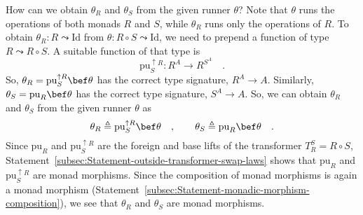 How can we obtain $\theta_{R}$ and $\theta_{S}$ from the given runner
$\theta$? Note that $\theta$ runs the operations of both monads
$R$ and $S$, while $\theta_{R}$ runs only the operations of $R$.
To obtain $\theta_{R}:R\leadsto\text{Id}$ from $\theta:R\circ S\leadsto\text{Id}$,
we need to prepend a function of type $R\leadsto R\circ S$. A suitable
function of that type is 
\[
\text{pu}_{S}^{\uparrow R}:R^{A}\rightarrow R^{S^{A}}\quad.
\]
So, $\theta_{R}=\text{pu}_{S}^{\uparrow R}\bef\theta$ has the correct
type signature, $R^{A}\rightarrow A$. Similarly, $\theta_{S}=\text{pu}_{R}\bef\theta$
has the correct type signature, $S^{A}\rightarrow A$. So, we can
obtain $\theta_{R}$ and $\theta_{S}$ from the given runner $\theta$
as
\[
\theta_{R}\triangleq\text{pu}_{S}^{\uparrow R}\bef\theta\quad,\quad\quad\theta_{S}\triangleq\text{pu}_{R}\bef\theta\quad.
\]
Since $\text{pu}_{R}$ and $\text{pu}_{S}^{\uparrow R}$ are the foreign
and base lifts of the transformer $T_{R}^{S}=R\circ S$, Statement~\ref{subsec:Statement-outside-transformer-swap-laws}
shows that $\text{pu}_{R}$ and $\text{pu}_{S}^{\uparrow R}$ are
monad morphisms. Since the composition of monad morphisms is again
a monad morphism (Statement~\ref{subsec:Statement-monadic-morphism-composition}),
we see that $\theta_{R}$ and $\theta_{S}$ are monad morphisms.


